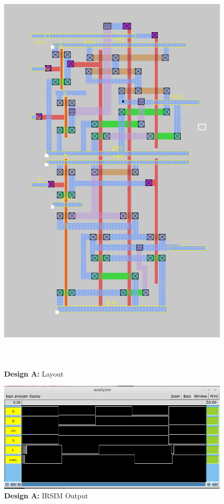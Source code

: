 \documentclass{article}
\begin{document}
\begin{figure}[H]
    \centering
    \includegraphics[height=8in]{../part_3/xiaohui/bitslice2.png}
    \caption{\textbf{Design A:} Layout}
\end{figure}

\newpage


\begin{figure}[H]
    \centering
    \includegraphics[width=\linewidth]{../part_3/xiaohui/irsimwaveform.png}
    \caption{\textbf{Design A:} IRSIM Output}
\end{figure}
\end{document}
